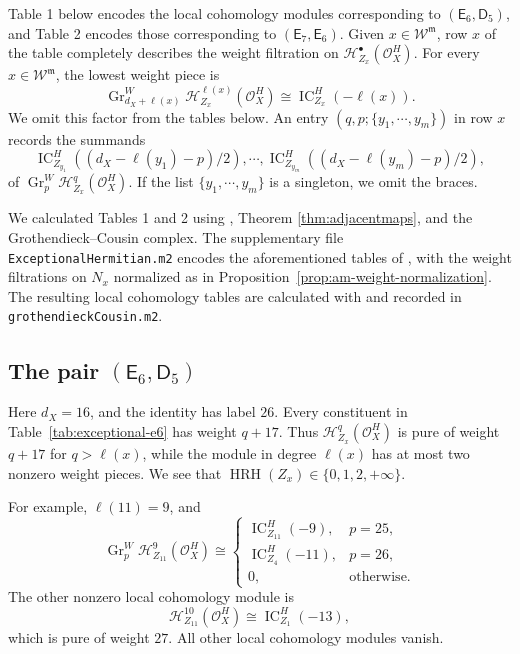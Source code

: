 \documentclass[12pt]{amsart}
\theoremstyle{definition}
\numberwithin{equation}{section}
\newcommand{\m}{\mathfrak m}
\newcommand{\W}{\mathscr W}
\begin{document}
Table 1 below encodes the local cohomology modules corresponding to $(\mathsf{E}_6,\mathsf{D}_5)$, and Table 2 encodes those corresponding to $(\mathsf{E}_7,\mathsf{E}_6)$. Given $x\in \W^{\m}$, row $x$ of the table completely describes the weight filtration on $\mathscr H^{\bullet}_{Z_x}(\mathscr O_X^H)$. For every $x\in\W^{\m}$, the lowest weight piece is
\[
 \operatorname{Gr}^W_{d_X+\ell(x)}
 \mathscr H^{\ell(x)}_{Z_x}(\mathscr O_X^H)
 \cong \operatorname{IC}_{Z_x}^H(-\ell(x)).
\]
We omit this factor from the tables below.
An entry $(q,p;\{y_1,\cdots,y_m\})$ in row $x$ records the summands
\[
\operatorname{IC}_{Z_{y_1}}^H((d_X-\ell(y_1)-p)/2),\cdots,\operatorname{IC}_{Z_{y_m}}^H((d_X-\ell(y_m)-p)/2),
\]
of $\operatorname{Gr}^W_p\mathscr H^q_{Z_x}(\mathscr O_X^H)$. If the list $\{y_1,\cdots,y_m\}$ is a singleton, we omit the braces. 

We calculated Tables 1 and 2 using \cite[Tables 7.1, 7.2]{cisWeight}, Theorem \ref{thm:adjacentmaps}, and the Grothendieck--Cousin complex. The supplementary file \texttt{ExceptionalHermitian.m2} encodes
the aforementioned tables of \cite{cisWeight}, with the weight filtrations on $N_x$
normalized as in Proposition~\ref{prop:am-weight-normalization}.
The resulting local cohomology tables are calculated with and recorded in \texttt{grothendieckCousin.m2}. 

\subsection{The pair $(\mathsf E_6,\mathsf D_5)$}

Here $d_X=16$, and the identity has label $26$.
Every constituent in Table~\ref{tab:exceptional-e6}
has weight $q+17$. Thus
$\mathscr H^q_{Z_x}(\mathscr O_X^H)$ is pure of weight $q+17$
for $q>\ell(x)$, while the module in degree $\ell(x)$
has at most two nonzero weight pieces. We see that $\operatorname{HRH}(Z_x)\in\{0,1,2,+\infty\}$.

For example, $\ell(11)=9$, and
\[
 \operatorname{Gr}^W_p\mathscr H^9_{Z_{11}}(\mathscr O_X^H)
 \cong
 \begin{cases}
  \operatorname{IC}_{Z_{11}}^H(-9),&p=25,\\
  \operatorname{IC}_{Z_4}^H(-11),&p=26,\\
  0,&\text{otherwise}.
 \end{cases}
\]
The other nonzero local cohomology module is
\[
 \mathscr H^{10}_{Z_{11}}(\mathscr O_X^H)
 \cong \operatorname{IC}_{Z_1}^H(-13),
\]
which is pure of weight $27$.
All other local cohomology modules vanish.
\end{document}
